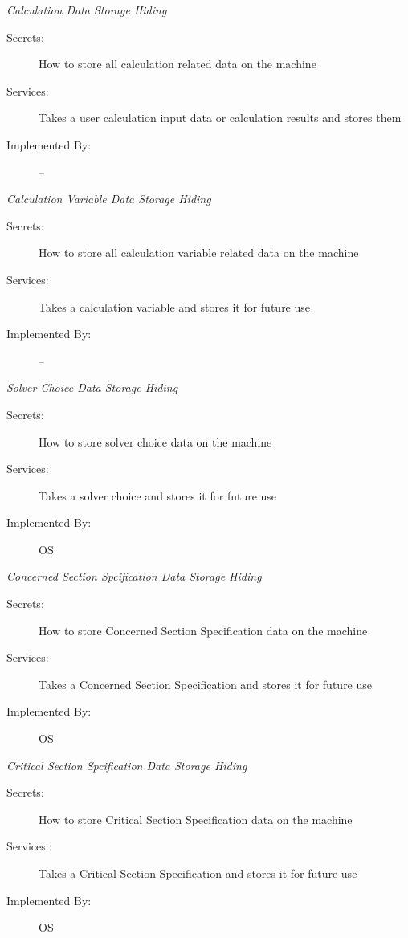\documentclass[12pt, titlepage]{article}
\begin{document}
    \emph{{\large Calculation Data Storage Hiding}}
    \begin{description}
        \item[Secrets:] How to store all calculation related data on the machine
        \item[Services:]Takes a user calculation input data or calculation results and stores them 
        \item[Implemented By:] --\\
    \end{description}
    \emph{{\large Calculation Variable Data Storage Hiding}}
    \begin{description}
        \item[Secrets:] How to store all calculation variable related data on the machine
        \item[Services:]Takes a calculation variable and stores it for future use
        \item[Implemented By:] --\\
    \end{description}
    \emph{{\large Solver Choice Data Storage Hiding}}
    \begin{description}
        \item[Secrets:] How to store solver choice data on the machine
        \item[Services:]Takes a solver choice and stores it for future use
        \item[Implemented By:] OS\\
    \end{description}
    \emph{{\large Concerned Section Spcification Data Storage Hiding}}
    \begin{description}
        \item[Secrets:] How to store Concerned Section Specification data on the machine
        \item[Services:]Takes a Concerned Section Specification and stores it for future use
        \item[Implemented By:] OS\\
    \end{description}
    \emph{{\large Critical Section Spcification Data Storage Hiding}}
    \begin{description}
        \item[Secrets:] How to store Critical Section Specification data on the machine
        \item[Services:]Takes a Critical Section Specification and stores it for future use
        \item[Implemented By:] OS\\
    \end{description}
\end{document}
